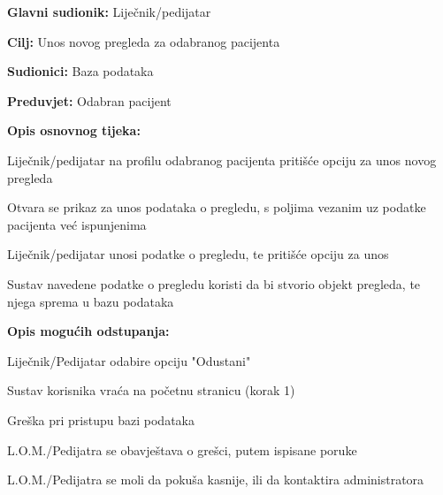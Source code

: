 					\noindent {}
					\begin{packed_item}
						
						\item \textbf{Glavni sudionik: }Liječnik/pedijatar
						\item  \textbf{Cilj:} Unos novog pregleda za odabranog pacijenta
						\item  \textbf{Sudionici:} Baza podataka
						\item  \textbf{Preduvjet:} Odabran pacijent
						\item  \textbf{Opis osnovnog tijeka:}
						
						\item[] \begin{packed_enum}
							
							\item Liječnik/pedijatar na profilu odabranog pacijenta pritišće opciju za unos novog pregleda
							\item Otvara se prikaz za unos podataka o pregledu, s poljima vezanim uz podatke pacijenta već ispunjenima
							\item Liječnik/pedijatar unosi podatke o pregledu, te pritišće opciju za unos
							\item Sustav navedene podatke o pregledu koristi da bi stvorio objekt pregleda, te njega sprema u bazu podataka
						\end{packed_enum}
						\item  \textbf{Opis mogućih odstupanja:}
						\item[] \begin{packed_item}
							\item[3.a] Liječnik/Pedijatar odabire opciju "Odustani"
							\item[] \begin{packed_enum}
								\item Sustav korisnika vraća na početnu stranicu (korak 1)
							\end{packed_enum}
							\item[4.a] Greška pri pristupu bazi podataka
							\item[] \begin{packed_enum}
								
								\item L.O.M./Pedijatra se obavještava o grešci, putem ispisane poruke
								\item L.O.M./Pedijatra se moli da pokuša kasnije, ili da kontaktira administratora
								
							\end{packed_enum}
						\end{packed_item}
						
					\end{packed_item}
					
